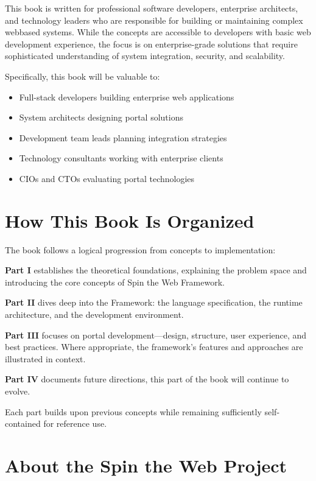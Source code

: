 This book is written for professional software developers, enterprise architects, and technology leaders who are responsible for building or maintaining complex webbased systems. While the concepts are accessible to developers with basic web development experience, the focus is on enterprise-grade solutions that require sophisticated understanding of system integration, security, and scalability.

Specifically, this book will be valuable to:
\begin{itemize}
\item Full-stack developers building enterprise web applications
\item System architects designing portal solutions
\item Development team leads planning integration strategies
\item Technology consultants working with enterprise clients
\item CIOs and CTOs evaluating portal technologies
\end{itemize}

\section*{How This Book Is Organized}

The book follows a logical progression from concepts to implementation:

\textbf{Part I} establishes the theoretical foundations, explaining the problem space and introducing the core concepts of Spin the Web Framework.

\textbf{Part II} dives deep into the Framework: the \wbdl language specification, the \webspinner runtime architecture, and the \studio development environment.

\textbf{Part III} focuses on portal development—design, structure, user experience, and best practices. Where appropriate, the framework’s features and approaches are illustrated in context.

\textbf{Part IV} documents future directions, this part of the book will continue to evolve.

Each part builds upon previous concepts while remaining sufficiently self-contained for reference use.

\section*{About the Spin the Web Project}

